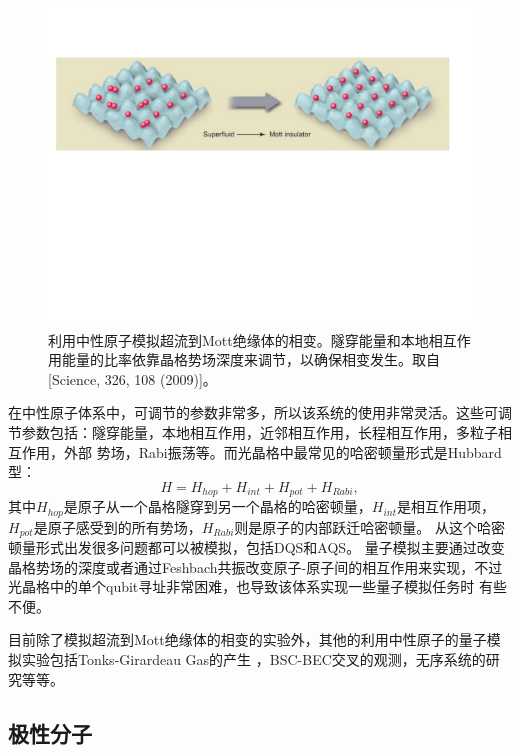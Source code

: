        \begin{figure}[htbp]
            \begin{center}
              \includegraphics[width= 0.8\columnwidth]{figures/mott.pdf}
              \caption{利用中性原子模拟超流到Mott绝缘体的相变。隧穿能量和本地相互作用能量的比率依靠晶格势场深度来调节，以确保相变发生。取自[Science, 326, 108 (2009)\cite{simreview}]。
              }
              \label{mott}
            \end{center}
        \end{figure}

在中性原子体系中，可调节的参数非常多，所以该系统的使用非常灵活。这些可调节参数包括：隧穿能量，本地相互作用，近邻相互作用，长程相互作用，多粒子相互作用，外部
势场，Rabi振荡等。而光晶格中最常见的哈密顿量形式是Hubbard型\cite{atomsim2}：
 \begin{equation}\label{optical}
 H = H_{hop}+H_{int}+H_{pot}+H_{Rabi},
\end{equation}
其中$H_{hop}$是原子从一个晶格隧穿到另一个晶格的哈密顿量，$H_{int}$是相互作用项，$H_{pot}$是原子感受到的所有势场，$H_{Rabi}$则是原子的内部跃迁哈密顿量。
从这个哈密顿量形式出发很多问题都可以被模拟，包括DQS和AQS。
量子模拟主要通过改变晶格势场的深度或者通过Feshbach共振改变原子-原子间的相互作用来实现，不过光晶格中的单个qubit寻址非常困难，也导致该体系实现一些量子模拟任务时
有些不便。

目前除了模拟超流到Mott绝缘体的相变的实验外，其他的利用中性原子的量子模拟实验包括Tonks-Girardeau Gas的产生\cite{atomsim4}
，BSC-BEC交叉的观测\cite{atomsim5}，无序系统的研究\cite{atomsim6,atomsim7}等等。

\subsection{极性分子}

